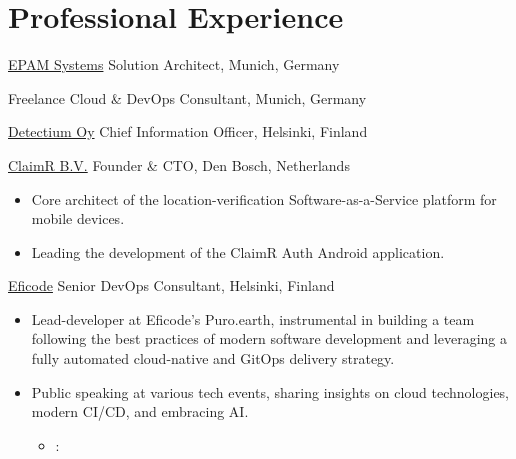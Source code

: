 \section{Professional Experience}{
     {\color{blue}\href{https://epam.com}{EPAM Systems}} %
     {Solution Architect,}
     {Munich, Germany}
     {}{}
     {\vspace{.5em}}

     {\color{blue}{Sole Practitioner}} %
     {Freelance Cloud \& DevOps Consultant,}
     {Munich, Germany}
     {}{}
     {\vspace{.5em}}

     {\color{blue}\href{https://detectium.io}{Detectium Oy}} %
     {Chief Information Officer,}
     {Helsinki, Finland}
     {}{}
     {\vspace{.5em}}

     {{\color{blue}\href{https://claimr.tools}{ClaimR B.V.}}}
     {Founder \& CTO,}
     {Den Bosch, Netherlands}
     {}{}
     {
     	\begin{itemize}[leftmargin=0.6cm, label={\textbullet}]
     		\item Core architect of the {} location-verification Software-as-a-Service platform for mobile devices. 
     		\item Leading the development of the ClaimR Auth Android application.
     	\end{itemize}
     }
     
     {{\color{blue}\href{https://eficode.com}{Eficode}}}
     {Senior DevOps Consultant,}
     {Helsinki, Finland}
     {}{}
     {
     	\begin{itemize}[leftmargin=0.6cm, label={\textbullet}]	       		      		    
     		\item Lead-developer at Eficode's {} Puro.earth, instrumental in building a team following the best practices of modern software development and leveraging a fully automated cloud-native and GitOps delivery strategy.
            
     		\item Public speaking at various tech events, sharing insights on cloud technologies, modern CI/CD, and embracing AI.
     		      \begin{itemize}
     		      	\item 
        :
    

\end{itemize}
\end{itemize}}}
